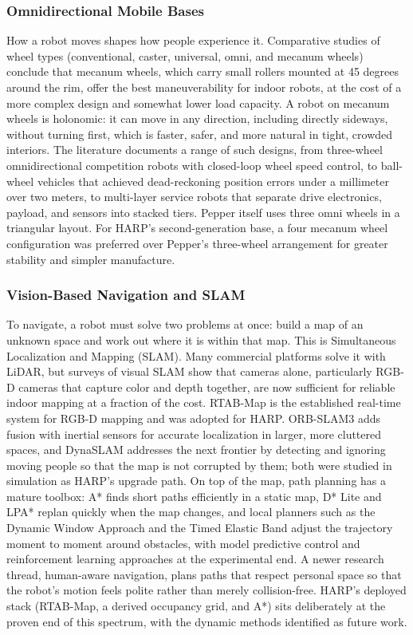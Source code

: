 \documentclass[11pt,a4paper]{article}
\begin{document}
\subsubsection{Omnidirectional Mobile Bases}

How a robot moves shapes how people experience it. Comparative studies of wheel types (conventional, caster, universal, omni, and mecanum wheels) conclude that mecanum wheels, which carry small rollers mounted at 45 degrees around the rim, offer the best maneuverability for indoor robots, at the cost of a more complex design and somewhat lower load capacity. A robot on mecanum wheels is holonomic: it can move in any direction, including directly sideways, without turning first, which is faster, safer, and more natural in tight, crowded interiors. The literature documents a range of such designs, from three-wheel omnidirectional competition robots with closed-loop wheel speed control, to ball-wheel vehicles that achieved dead-reckoning position errors under a millimeter over two meters, to multi-layer service robots that separate drive electronics, payload, and sensors into stacked tiers. Pepper itself uses three omni wheels in a triangular layout. For HARP's second-generation base, a four mecanum wheel configuration was preferred over Pepper's three-wheel arrangement for greater stability and simpler manufacture.

\subsubsection{Vision-Based Navigation and SLAM}

To navigate, a robot must solve two problems at once: build a map of an unknown space and work out where it is within that map. This is Simultaneous Localization and Mapping (SLAM). Many commercial platforms solve it with LiDAR, but surveys of visual SLAM show that cameras alone, particularly RGB-D cameras that capture color and depth together, are now sufficient for reliable indoor mapping at a fraction of the cost. RTAB-Map is the established real-time system for RGB-D mapping and was adopted for HARP. ORB-SLAM3 adds fusion with inertial sensors for accurate localization in larger, more cluttered spaces, and DynaSLAM addresses the next frontier by detecting and ignoring moving people so that the map is not corrupted by them; both were studied in simulation as HARP's upgrade path. On top of the map, path planning has a mature toolbox: A* finds short paths efficiently in a static map, D* Lite and LPA* replan quickly when the map changes, and local planners such as the Dynamic Window Approach and the Timed Elastic Band adjust the trajectory moment to moment around obstacles, with model predictive control and reinforcement learning approaches at the experimental end. A newer research thread, human-aware navigation, plans paths that respect personal space so that the robot's motion feels polite rather than merely collision-free. HARP's deployed stack (RTAB-Map, a derived occupancy grid, and A*) sits deliberately at the proven end of this spectrum, with the dynamic methods identified as future work.
\end{document}
